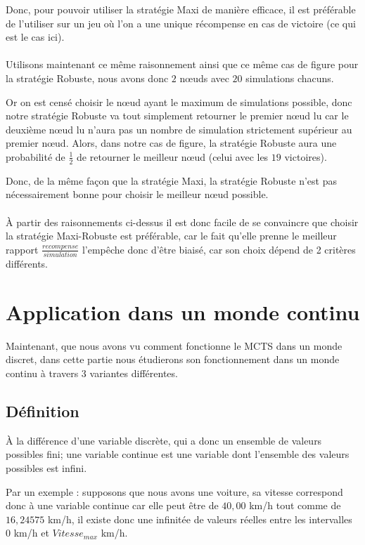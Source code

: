 \documentclass[pdftex,french, english]{article}	%
\begin{document}
Donc, pour pouvoir utiliser la stratégie Maxi de manière efficace, il est préférable de l'utiliser sur un jeu où l'on a une unique récompense en cas de victoire (ce qui est le cas ici).
\\ \\
Utilisons maintenant ce même raisonnement ainsi que ce même cas de figure pour la stratégie Robuste, nous avons donc $2$ nœuds avec $20$ simulations chacuns. 

Or on est censé choisir le nœud ayant le maximum de simulations possible, donc notre stratégie Robuste va tout simplement retourner le premier nœud lu car le deuxième nœud lu n'aura pas un nombre de simulation strictement supérieur au premier nœud. Alors, dans notre cas de figure, la stratégie Robuste aura une probabilité de $\frac{1}{2}$ de retourner le meilleur nœud (celui avec les $19$ victoires).

Donc, de la même façon que la stratégie Maxi, la stratégie Robuste n'est pas nécessairement bonne pour choisir le meilleur nœud possible.
\\ \\
À partir des raisonnements ci-dessus il est donc facile de se convaincre que choisir la stratégie Maxi-Robuste est préférable, car le fait qu'elle prenne le meilleur rapport $\frac{recompense}{simulation}$ l'empêche donc d'être biaisé, car son choix dépend de 2 critères différents.

\newpage

\section{Application dans un monde continu} \label{continu}

Maintenant, que nous avons vu comment fonctionne le MCTS dans un monde discret, dans cette partie nous étudierons son fonctionnement dans un monde continu à travers 3 variantes différentes.
	\subsection{Définition}

	À la différence d'une variable discrète, qui a donc un ensemble de valeurs possibles fini; une variable continue est une variable dont l'ensemble des valeurs possibles est infini.

	Par un exemple : supposons que nous avons une voiture, sa vitesse correspond donc à une variable continue car elle peut être de $40,00$ km/h tout comme de $16,24575$ km/h, il existe donc une infinitée de valeurs réelles entre les intervalles $0$ km/h et $Vitesse_{max}$ km/h. \\
\end{document}
